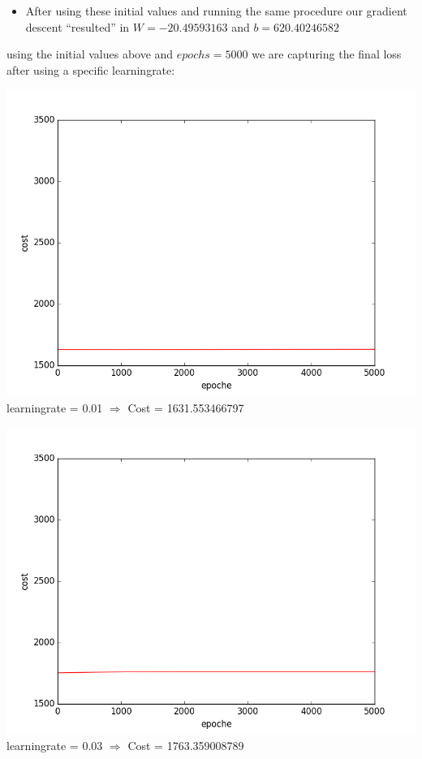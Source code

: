 \documentclass[12pt]{article}
\begin{document}
\begin{enumerate}[a)]
\begin{itemize}
            \item
                After using these initial values and running the same procedure our gradient descent ``resulted'' in $W = -20.49593163$ and $b = 620.40246582$
        \end{itemize}

        using the initial values above and $epochs = 5000$ we are capturing the final loss after using a specific learningrate:


                \begin{center}
                    \includegraphics[scale = 0.52]{pictures/cost5000_w-20,0_b619,0_learn0,01}\\
                    learningrate = 0.01 $\Rightarrow$ Cost = 1631.553466797\\
                \end{center}

                \begin{center}
                    \includegraphics[scale = 0.52]{pictures/cost5000_w-20,0_b619,0_learn0,03}\\
                    learningrate = 0.03 $\Rightarrow$ Cost = 1763.359008789\\
                \end{center}


\end{enumerate}
\end{document}

